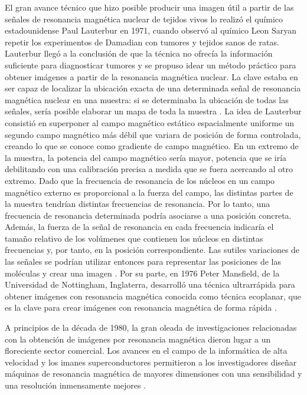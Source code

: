 El gran avance técnico que hizo posible producir una imagen útil a partir de las señales de resonancia magnética nuclear de tejidos vivos lo realizó el químico estadounidense Paul Lauterbur en 1971, cuando observó al químico Leon Saryan repetir los experimentos de Damadian con tumores y tejidos sanos de ratas. Lauterbur llegó a la conclusión de que la técnica no ofrecía la información suficiente para diagnosticar tumores y se propuso idear un método práctico para obtener imágenes a partir de la resonancia magnética nuclear. La clave estaba en ser capaz de localizar la ubicación exacta de una determinada señal de resonancia magnética nuclear en una muestra: si se determinaba la ubicación de todas las señales, sería posible elaborar un mapa de toda la muestra \cite{Luiten2003,Jara2013}. La idea de Lauterbur consistió en superponer al campo magnético estático espacialmente uniforme un segundo campo magnético más débil que variara de posición de forma controlada, creando lo que se conoce como gradiente de campo magnético. En un extremo de la muestra, la potencia del campo magnético sería mayor, potencia que se iría debilitando con una calibración precisa a medida que se fuera acercando al otro extremo. Dado que la frecuencia de resonancia de los núcleos en un campo magnético externo es proporcional a la fuerza del campo, las distintas partes de la muestra tendrían distintas frecuencias de resonancia. Por lo tanto, una frecuencia de resonancia determinada podría asociarse a una posición concreta. Además, la fuerza de la señal de resonancia en cada frecuencia indicaría el tamaño relativo de los volúmenes que contienen los núcleos en distintas frecuencias y, por tanto, en la posición correspondiente. Las sutiles variaciones de las señales se podrían utilizar entonces para representar las posiciones de las moléculas y crear una imagen \cite{Andrew2007}. Por su parte, en 1976 Peter Mansfield, de la Universidad de Nottingham, Inglaterra, desarrolló una técnica ultrarrápida para obtener imágenes con resonancia magnética conocida como técnica ecoplanar, que es la clave para crear imágenes con resonancia magnética de forma rápida \cite{Luiten2003,Andrew2007}. 

A principios de la década de 1980, la gran oleada de investigaciones relacionadas con la obtención de imágenes por resonancia magnética dieron lugar a un floreciente sector comercial. Los avances en el campo de la informática de alta velocidad y los imanes superconductores permitieron a los investigadores diseñar máquinas de resonancia magnética de mayores dimensiones con una sensibilidad y una resolución inmensamente mejores \cite{Jara2013}.


